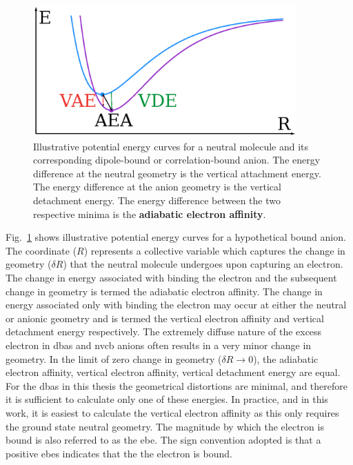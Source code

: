 \begin{figure}
	\centering
	\includegraphics[width=0.9\textwidth,keepaspectratio]{Images/chapter1/morse.eps}
	\caption{Illustrative potential energy curves for a neutral molecule and its corresponding dipole-bound or correlation-bound anion. The energy difference at the neutral geometry is the vertical attachment energy. The energy difference at the anion geometry is the vertical detachment energy. The energy difference between the two respective minima is the \textbf{adiabatic electron affinity}.}
	\label{fig:morse}
\end{figure}

Fig.~\ref{fig:morse} shows illustrative potential energy curves for a hypothetical bound anion.
The coordinate ($R$) represents a collective variable which captures the change in geometry ($\delta R$) that the neutral molecule undergoes upon capturing an electron.
The change in energy associated with binding the electron and the subsequent change in geometry is termed the adiabatic electron affinity.
The change in energy associated only with binding the electron may occur at either the neutral or anionic geometry and is termed the vertical electron affinity and vertical detachment energy respectively.
The extremely diffuse nature of the excess electron in \glspl{dba} and \gls{nvcb} anions often results in a very minor change in geometry.
In the limit of zero change in geometry ($\delta R \rightarrow 0$), the adiabatic electron affinity, vertical electron affinity, vertical detachment energy are equal.
For the \glspl{dba} in this thesis the geometrical distortions are minimal, and therefore it is sufficient to calculate only one of these energies.
In practice, and in this work, it is easiest to calculate the vertical electron affinity as this only requires the ground state neutral geometry.
The magnitude by which the electron is bound is also referred to as the \gls{ebe}.
The sign convention adopted is that a positive \glspl{ebe} indicates that the the electron is bound.
